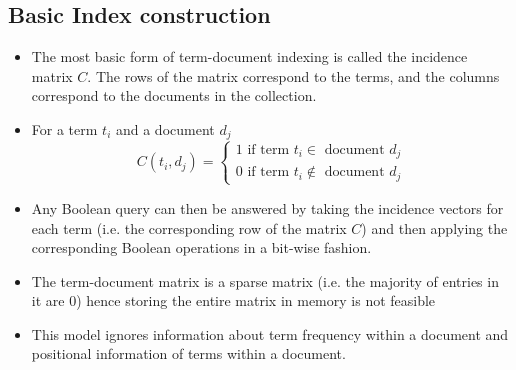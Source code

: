\documentclass{article}
\begin{document}
\subsection{Basic Index construction}
\begin{itemize}
    \item The most basic form of term-document indexing is called the incidence matrix $C$. The rows of the matrix correspond to the terms, and the columns correspond to the documents in the collection.
    
    \item For a term $t_i$ and a document $d_j$
    \begin{equation*}
        C(t_i, d_j) = \begin{cases}
        1 \text{ if term $t_i \in$ document $d_j$} \\
        0 \text{ if term $t_i \notin$  document $d_j$}
        \end{cases}
    \end{equation*}
    
    \item Any Boolean query can then be answered by taking the incidence vectors for each term (i.e. the corresponding row of the matrix $C$) and then applying the corresponding Boolean operations in a bit-wise fashion. 
    
    \item The term-document matrix is a sparse matrix (i.e. the majority of entries in it are 0) hence storing the entire matrix in memory is not feasible 
    
    \item This model ignores information about term frequency within a document and positional information of terms within a document. 
\end{itemize}
\end{document}
